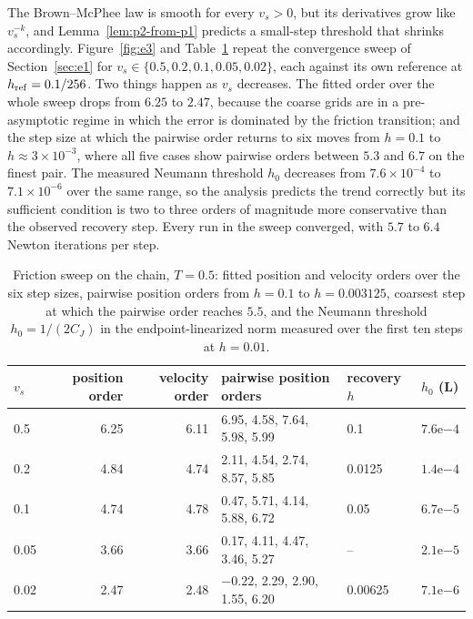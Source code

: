 The Brown--McPhee law is smooth for every $v_s>0$, but its derivatives grow like $v_s^{-k}$, and
Lemma~\ref{lem:p2-from-p1} predicts a small-step threshold that shrinks accordingly.
Figure~\ref{fig:e3} and Table~\ref{tab:e3} repeat the convergence sweep of Section~\ref{sec:e1}
for $v_s\in\{0.5,0.2,0.1,0.05,0.02\}$, each against its own reference at $h_{\rm ref}=0.1/256$.
Two things happen as $v_s$ decreases. The fitted order over the whole sweep drops from $6.25$ to
$2.47$, because the coarse grids are in a pre-asymptotic regime in which the error is dominated by
the friction transition; and the step size at which the pairwise order returns to six moves from
$h=0.1$ to $h\approx3\times10^{-3}$, where all five cases show pairwise orders between $5.3$ and
$6.7$ on the finest pair. The measured Neumann threshold $h_0$ decreases from $7.6\times10^{-4}$ to
$7.1\times10^{-6}$ over the same range, so the analysis predicts the trend correctly but its
sufficient condition is two to three orders of magnitude more conservative than the observed
recovery step. Every run in the sweep converged, with $5.7$ to $6.4$ Newton iterations per step.

\begin{table}[!htb]
\centering
\caption{Friction sweep on the chain, $T=0.5$: fitted position and velocity orders over the six
step sizes, pairwise position orders from $h=0.1$ to $h=0.003125$, coarsest step at which the
pairwise order reaches $5.5$, and the Neumann threshold $h_0=1/(2C_J)$ in the endpoint-linearized
norm measured over the first ten steps at $h=0.01$.}
\label{tab:e3}
\scriptsize
\setlength{\tabcolsep}{3.5pt}
\begin{tabular}{@{}lrrlll@{}}
\toprule
$v_s$ & position order & velocity order & pairwise position orders & recovery $h$ & $h_0$ (L) \\
\midrule
0.5  & 6.25 & 6.11 & 6.95, 4.58, 7.64, 5.98, 5.99 & 0.1     & $7.6\mathrm{e}{-4}$ \\
0.2  & 4.84 & 4.74 & 2.11, 4.54, 2.74, 8.57, 5.85 & 0.0125  & $1.4\mathrm{e}{-4}$ \\
0.1  & 4.74 & 4.78 & 0.47, 5.71, 4.14, 5.88, 6.72 & 0.05    & $6.7\mathrm{e}{-5}$ \\
0.05 & 3.66 & 3.66 & 0.17, 4.11, 4.47, 3.46, 5.27 & --      & $2.1\mathrm{e}{-5}$ \\
0.02 & 2.47 & 2.48 & $-0.22$, 2.29, 2.90, 1.55, 6.20 & 0.00625 & $7.1\mathrm{e}{-6}$ \\
\bottomrule
\end{tabular}
\end{table}


